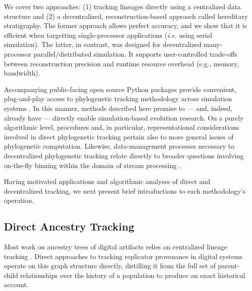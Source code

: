 
We cover two approaches: (1) tracking lineages directly using a centralized data structure and (2) a decentralized, reconstruction-based approach called hereditary stratigraphy.
The former approach allows perfect accuracy, and we show that it is efficient when targetting single-processor applications (\textit{i.e.} using serial simulation).
The latter, in contrast, was designed for decentralized many-processor parallel/distributed simulation.
It supports user-controlled trade-offs between reconstruction precision and runtime resource overhead (e.g., memory, bandwidth).

Accompanying public-facing open source Python packages provide convenient, plug-and-play access to phylogenetic tracking methodology across simulation systems \citep{moreno2022hstrat,dolson2023phylotrackpy}.
In this manner, methods described here promise to --- and, indeed, already have --- directly enable simulation-based evolution research.
On a purely algorithmic level, procedures and, in particular, representational considerations involved in direct phylogenetic tracking pertain also to more general issues of phylogenetic computation.
Likewise, data-management processes necessary to decentralized phylogenetic tracking relate directly to broader questions involving on-the-fly binning within the domain of stream processing \citep{OTHERPREPRINT}. %

Having motivated applications and algorithmic analyses of direct and decentralized tracking, we next present brief introductions to each methodology's operation.

\subsection{Direct Ancestry Tracking}

Most work on ancestry trees of digital artifacts relies on centralized lineage tracking \citep{friggeri2014rumor,cohen1987computer,dolson2023phylotrackpy}.
Direct approaches to tracking replicator provenance in digital systems operate on this graph structure directly, distilling it from the full set of parent-child relationships over the history of a population to produce an exact historical account.

